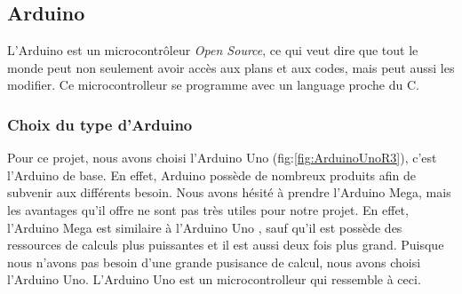 \documentclass[a4paper,12pt]{report}
\begin{document}
{\subsection{Arduino}
L'Arduino \label{Arduino} \cite{Arduino} est un microcontrôleur \textit{Open Source}, ce qui veut dire que tout le monde peut non seulement avoir accès aux plans et aux codes, mais peut aussi les modifier. Ce microcontrolleur se programme avec un language proche du C. 


\subsubsection{Choix du type d'Arduino}
Pour ce projet, nous avons choisi l'Arduino Uno (fig:\ref{fig:ArduinoUnoR3}), c'est l'Arduino de base. En effet, Arduino possède de nombreux produits afin de subvenir aux différents besoin. Nous avons hésité à prendre l'Arduino Mega, mais les avantages qu'il offre ne sont pas très utiles pour notre projet. En effet, l'Arduino Mega est similaire à l'Arduino Uno , sauf qu'il est possède des ressources de calculs plus puissantes et il est aussi deux fois plus grand. Puisque nous n'avons pas besoin d'une grande pusisance de calcul, nous avons choisi l'Arduino Uno. L'Arduino Uno est un microcontrolleur qui ressemble à ceci.\\

}
\end{document}
